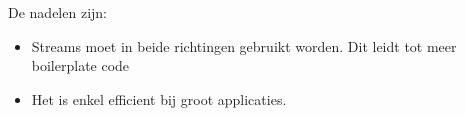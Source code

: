 De nadelen zijn:
\begin{itemize}
    \item Streams moet in beide richtingen gebruikt worden. Dit leidt tot meer boilerplate code
    \item Het is enkel efficient bij groot applicaties. 
\end{itemize}









